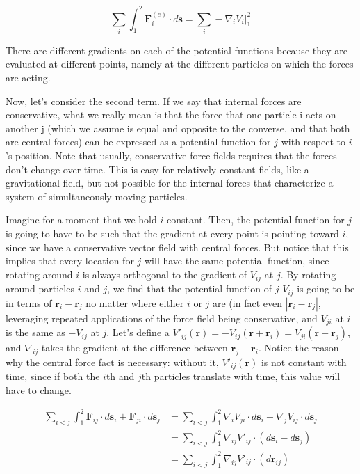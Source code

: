 \documentclass{article}
\begin{document}
$$
\sum_i\int_1^2 \mathbf{F}_i^{(e)}\cdot d\mathbf{s}  = \sum_i -\nabla_iV_i\Big\vert_1^2
$$

There are different gradients on each of the potential functions because they are evaluated at different points, namely at the different particles on which the forces are acting. 

Now, let’s consider the second term. If we say that internal forces are conservative, what we really mean is that the force that one particle i acts on another j (which we assume is equal and opposite to the converse, and that both are central forces) can be expressed as a potential function for $j$ with respect to $i$’s position. Note that usually, conservative force fields requires that the forces don’t change over time. This is easy for relatively constant fields, like a gravitational field, but not possible for the internal forces that characterize a system of simultaneously moving particles.

Imagine for a moment that we hold $i$ constant. Then, the potential function for $j$ is going to have to be such that the gradient at every point is pointing toward $i$, since we have a conservative vector field with central forces. But notice that this implies that every location for $j$ will have the same potential function, since rotating around $i$ is always orthogonal to the gradient of $V_{ij}$ at $j$. By rotating around particles $i$ and $j$, we find that the potential function of $j$ $V_{ij}$ is going to be in terms of $\mathbf{r}_i - \mathbf{r}_j$ no matter where either $i$ or $j$ are (in fact even $|\mathbf{r}_i - \mathbf{r}_j|$, leveraging repeated applications of the force field being conservative, and $V_{ji}$ at $i$ is the same as $-V_{ij}$ at $j$. Let’s define a $V'_{ij}(\mathbf{r}) = -V_{ij}(\mathbf{r} + \mathbf{r}_i) = V_{ji}(\mathbf{r} + \mathbf{r}_j)$, and $\nabla_{ij}$ takes the gradient at the difference between $\mathbf{r}_j - \mathbf{r}_i$. Notice the reason why the central force fact is necessary: without it, $V'_{ij}(\mathbf{r})$ is not constant with time, since if both the $i$th and $j$th particles translate with time, this value will have to change. 

$$
\begin{align*}
\sum_{i<j}\int_1^2 \mathbf{F}_{ij}\cdot d\mathbf{s}_i + \mathbf{F}_{ji}\cdot d\mathbf{s}_j &= \sum_{i<j}\int_1^2 \nabla_iV_{ji}\cdot d\mathbf{s}_i + \nabla_jV_{ij}\cdot d\mathbf{s}_j\\
&= \sum_{i<j}\int_1^2 \nabla_{ij}V'_{ij}\cdot (d\mathbf{s}_i - d\mathbf{s}_j)\\
&=\sum_{i<j}\int_1^2 \nabla_{ij}V'_{ij}\cdot (d\mathbf{r}_{ij})
\end{align*}
$$
\end{document}
